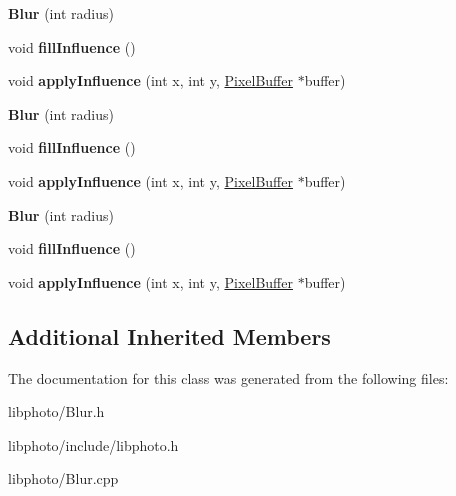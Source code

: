 \begin{DoxyCompactItemize}
\item 
\hypertarget{classBlur_a4cf976a139e3745e022c6b4fb7b18efb}{{\bfseries Blur} (int radius)}\label{classBlur_a4cf976a139e3745e022c6b4fb7b18efb}

\item 
\hypertarget{classBlur_a6db41e9d70814abd7d188eee08779c7a}{void {\bfseries fill\-Influence} ()}\label{classBlur_a6db41e9d70814abd7d188eee08779c7a}

\item 
\hypertarget{classBlur_a74a6e5acef4b46edc5c79e909296ff53}{void {\bfseries apply\-Influence} (int x, int y, \hyperlink{classPixelBuffer}{Pixel\-Buffer} $\ast$buffer)}\label{classBlur_a74a6e5acef4b46edc5c79e909296ff53}

\item 
\hypertarget{classBlur_a4cf976a139e3745e022c6b4fb7b18efb}{{\bfseries Blur} (int radius)}\label{classBlur_a4cf976a139e3745e022c6b4fb7b18efb}

\item 
\hypertarget{classBlur_a6db41e9d70814abd7d188eee08779c7a}{void {\bfseries fill\-Influence} ()}\label{classBlur_a6db41e9d70814abd7d188eee08779c7a}

\item 
\hypertarget{classBlur_a74a6e5acef4b46edc5c79e909296ff53}{void {\bfseries apply\-Influence} (int x, int y, \hyperlink{classPixelBuffer}{Pixel\-Buffer} $\ast$buffer)}\label{classBlur_a74a6e5acef4b46edc5c79e909296ff53}

\item 
\hypertarget{classBlur_a4cf976a139e3745e022c6b4fb7b18efb}{{\bfseries Blur} (int radius)}\label{classBlur_a4cf976a139e3745e022c6b4fb7b18efb}

\item 
\hypertarget{classBlur_a6db41e9d70814abd7d188eee08779c7a}{void {\bfseries fill\-Influence} ()}\label{classBlur_a6db41e9d70814abd7d188eee08779c7a}

\item 
\hypertarget{classBlur_a74a6e5acef4b46edc5c79e909296ff53}{void {\bfseries apply\-Influence} (int x, int y, \hyperlink{classPixelBuffer}{Pixel\-Buffer} $\ast$buffer)}\label{classBlur_a74a6e5acef4b46edc5c79e909296ff53}

\end{DoxyCompactItemize}
\subsection*{Additional Inherited Members}


The documentation for this class was generated from the following files\-:\begin{DoxyCompactItemize}
\item 
libphoto/Blur.\-h\item 
libphoto/include/libphoto.\-h\item 
libphoto/Blur.\-cpp\end{DoxyCompactItemize}
